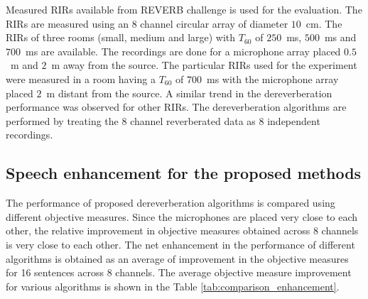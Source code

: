 Measured RIRs available from REVERB challenge \cite{reverb2014} is used for the evaluation. The RIRs are measured using an $8$ channel circular array of diameter $10$~cm. The RIRs of three rooms (small, medium and large) with $T_{60}$ of $250$~ms, $500$~ms and $700$~ms are available. The recordings are done for a microphone array placed $0.5$~m and $2$~m away from the source. 
The particular RIRs used for the experiment were measured in a room having a $T_{60}$ of $700$~ms with the microphone array placed $2$~m distant from the source. A similar trend in the dereverberation performance was observed for other RIRs. The dereverberation algorithms are performed by treating the 8 channel reverberated data as 8 independent recordings. 
\subsection{Speech enhancement for the proposed methods}
The performance of proposed dereverberation algorithms is compared using different objective measures. Since the microphones are placed very close to each other, the relative improvement in objective measures obtained across 8 channels is very close to each other. The net enhancement in the performance of different algorithms is obtained as an average of improvement in the objective measures for 16 sentences across 8 channels. The average objective measure improvement for various algorithms is shown in the Table \ref{tab:comparison_enhancement}.

